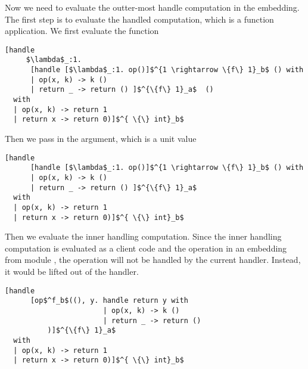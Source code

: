  Now we need to evaluate the outter-most handle computation in the embedding. The first step is to evaluate the handled computation, which is a function application. We first evaluate the function
  \begin{lstlisting}[mathescape = true]
[handle 
     $\lambda$_:1. 
      [handle [$\lambda$_:1. op()]$^{1 \rightarrow \{f\} 1}_b$ () with
      | op(x, k) -> k ()
      | return _ -> return () ]$^{\{f\} 1}_a$  () 
  with 
  | op(x, k) -> return 1
  | return x -> return 0)]$^{ \{\} int}_b$
 \end{lstlisting}
 Then we pass in the argument, which is a unit value
  \begin{lstlisting}[mathescape = true]
[handle 
      [handle [$\lambda$_:1. op()]$^{1 \rightarrow \{f\} 1}_b$ () with
      | op(x, k) -> k ()
      | return _ -> return () ]$^{\{f\} 1}_a$ 
  with 
  | op(x, k) -> return 1
  | return x -> return 0)]$^{ \{\} int}_b$
\end{lstlisting}  
Then we evaluate the inner handling computation. Since the inner handling computation is evaluated as a client code and the operation  in an embedding from module , the operation will not be handled by the current handler. Instead, it would be lifted out of the handler.

  
  

  \begin{lstlisting}[mathescape = true]
[handle 
      [op$^f_b$((), y. handle return y with
                       | op(x, k) -> k ()
                       | return _ -> return () 
          )]$^{\{f\} 1}_a$ 
  with 
  | op(x, k) -> return 1
  | return x -> return 0)]$^{ \{\} int}_b$
  \end{lstlisting}
  
